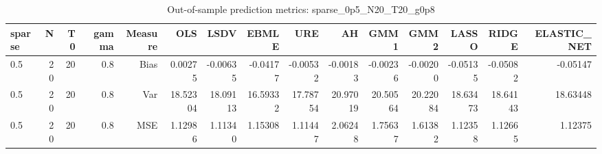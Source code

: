 \begin{table}[!htbp]\centering
\caption{Out-of-sample prediction metrics: sparse_0p5_N20_T20_g0p8}
\label{tab:table3_sparse_0p5_N20_T20_g0p8}
\begin{tabular}{lrrrrrrrrrrrrrr}
\hline
sparse & N & T0 & gamma & Measure & OLS & LSDV & EBMLE & URE & AH & GMM1 & GMM2 & LASSO & RIDGE & ELASTIC_NET \\
\hline
0.5 & 20 & 20 & 0.8 & Bias & 0.00275 & -0.00635 & -0.04177 & -0.00532 & -0.00183 & -0.00236 & -0.00200 & -0.05135 & -0.05082 & -0.05147 \\
0.5 & 20 & 20 & 0.8 & Var & 18.52304 & 18.09113 & 16.59332 & 17.78754 & 20.97019 & 20.50564 & 20.22084 & 18.63473 & 18.64143 & 18.63448 \\
0.5 & 20 & 20 & 0.8 & MSE & 1.12986 & 1.11340 & 1.15308 & 1.11447 & 2.06248 & 1.75637 & 1.61382 & 1.12358 & 1.12665 & 1.12375 \\
\hline
\end{tabular}
\end{table}

